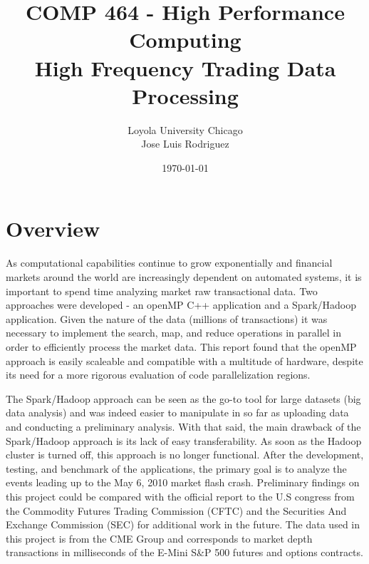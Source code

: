 \documentclass[12pt]{article} %
\title{COMP 464 - High Performance Computing \\ High Frequency Trading Data Processing} %
\author{
Loyola University Chicago \\
Jose Luis Rodriguez 
} %
\date{\today} %
\begin{document}
\maketitle

\thispagestyle{fancy}


\section{Overview}

As computational capabilities continue to grow exponentially and financial markets around the world are increasingly dependent on automated systems, it is important to spend time analyzing market raw transactional data. Two approaches were developed - an openMP C++ application and a Spark/Hadoop application. Given the nature of the data (millions of transactions) it was necessary to implement the search, map, and reduce operations in parallel in order to efficiently process the market data. This report found that the openMP approach is easily scaleable and compatible with a multitude of hardware, despite its need for a more rigorous evaluation of code parallelization regions. 

The Spark/Hadoop approach can be seen as the go-to tool for large datasets (big data analysis) and was indeed easier to manipulate in so far as uploading data and conducting a preliminary analysis. With that said, the main drawback of the Spark/Hadoop approach is its lack of easy transferability. As soon as the Hadoop cluster is turned off, this approach is no longer functional. After the development, testing, and benchmark of the applications, the primary goal is to analyze the events leading up to the May 6, 2010 market flash crash. Preliminary findings on this project could be compared with the official report to the U.S congress from the Commodity Futures Trading Commission (CFTC) and the Securities And Exchange Commission (SEC) for additional work in the future. The data used in this project is from the CME Group and corresponds to market depth transactions in milliseconds of the E-Mini S\&P 500 futures and options contracts. 


\end{document}
